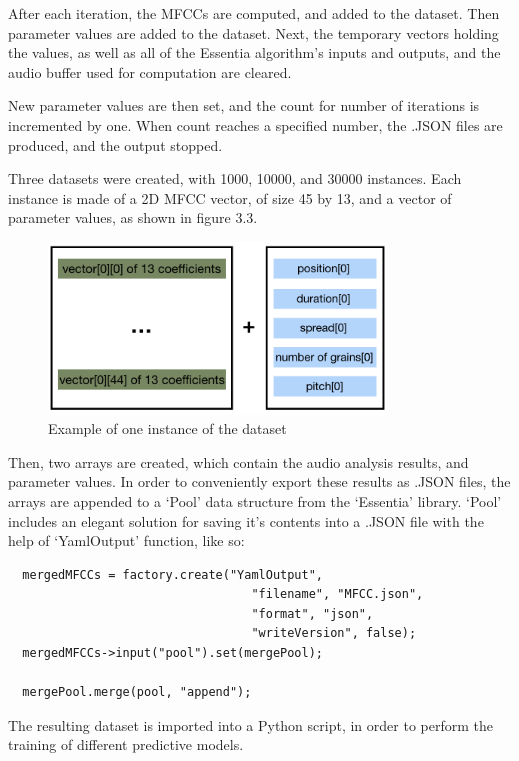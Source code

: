 After each iteration, the MFCCs are computed, and added to the
dataset. Then parameter values are added to the dataset. Next, the
temporary vectors holding the values, as well as all of the Essentia
algorithm's inputs and outputs, and the audio buffer used for
computation are cleared.

New parameter values are then set, and the count for number of
iterations is incremented by one. When count reaches a specified
number, the .JSON files are produced, and the output stopped.

Three datasets were created, with 1000, 10000, and 30000
instances. Each instance is made of a 2D MFCC vector, of size 45 by
13, and a vector of parameter values, as shown in figure 3.3. 

\begin{figure}[!ht]
\caption{Example of one instance of the dataset}
\centering
\includegraphics[width=0.8\textwidth]{images/dataset_example}
\end{figure}

Then, two arrays are created, which contain the audio analysis
results, and parameter values. In order to conveniently export these
results as .JSON files, the arrays are appended to a `Pool' data
structure from the `Essentia' library. `Pool' includes an elegant
solution for saving it's contents into a .JSON file with the help of
`YamlOutput' function, like so:

\begin{lstlisting}
  mergedMFCCs = factory.create("YamlOutput",
                                  "filename", "MFCC.json",
                                  "format", "json",
                                  "writeVersion", false);
  mergedMFCCs->input("pool").set(mergePool);

  mergePool.merge(pool, "append");
\end{lstlisting}

The resulting dataset is imported into a Python script, in order to
perform the training of different predictive models.

